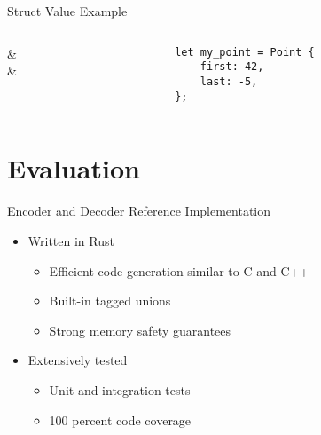\documentclass{beamer}
\begin{document}
\begin{frame}[fragile]{Struct Value Example}
	\begin{columns}
		\begin{column}{0.5\textwidth}
			\center
			\begin{bytefield}{12}
				 &  \\
				 &  \\
			\end{bytefield}
		\end{column}
		\begin{column}{0.5\textwidth}
			\center
			\begin{lstlisting}
let my_point = Point {
	first: 42,
	last: -5,
};
			\end{lstlisting}
		\end{column}
	\end{columns}
\end{frame}

\section{Evaluation}

\begin{frame}{Encoder and Decoder Reference Implementation}
	\begin{itemize}
		\item Written in Rust
		      \begin{itemize}
			      \item Efficient code generation similar to C and C++
			      \item Built-in tagged unions
			      \item Strong memory safety guarantees
		      \end{itemize}
		\item Extensively tested
		      \begin{itemize}
			      \item Unit and integration tests
			      \item 100 percent code coverage
		      \end{itemize}
	\end{itemize}
\end{frame}
\end{document}
